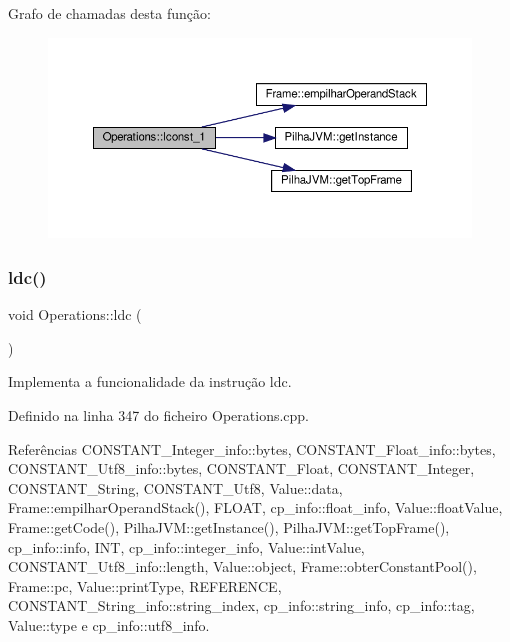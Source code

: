 Grafo de chamadas desta função\+:
\nopagebreak
\begin{figure}[H]
\begin{center}
\leavevmode
\includegraphics[width=350pt]{classOperations_ae6c6a8e3d75dec712e534434f85909ce_cgraph}
\end{center}
\end{figure}
\mbox{\label{classOperations_aa9a87c1ef4605d0b7b7a99c8d9bc693c}} 
\subsubsection{\texorpdfstring{ldc()}{ldc()}}
{\footnotesize\ttfamily void Operations\+::ldc (\begin{DoxyParamCaption}{ }\end{DoxyParamCaption})\hspace{0.3cm}{\ttfamily [private]}}



Implementa a funcionalidade da instrução ldc. 



Definido na linha 347 do ficheiro Operations.\+cpp.



Referências C\+O\+N\+S\+T\+A\+N\+T\+\_\+\+Integer\+\_\+info\+::bytes, C\+O\+N\+S\+T\+A\+N\+T\+\_\+\+Float\+\_\+info\+::bytes, C\+O\+N\+S\+T\+A\+N\+T\+\_\+\+Utf8\+\_\+info\+::bytes, C\+O\+N\+S\+T\+A\+N\+T\+\_\+\+Float, C\+O\+N\+S\+T\+A\+N\+T\+\_\+\+Integer, C\+O\+N\+S\+T\+A\+N\+T\+\_\+\+String, C\+O\+N\+S\+T\+A\+N\+T\+\_\+\+Utf8, Value\+::data, Frame\+::empilhar\+Operand\+Stack(), F\+L\+O\+AT, cp\+\_\+info\+::float\+\_\+info, Value\+::float\+Value, Frame\+::get\+Code(), Pilha\+J\+V\+M\+::get\+Instance(), Pilha\+J\+V\+M\+::get\+Top\+Frame(), cp\+\_\+info\+::info, I\+NT, cp\+\_\+info\+::integer\+\_\+info, Value\+::int\+Value, C\+O\+N\+S\+T\+A\+N\+T\+\_\+\+Utf8\+\_\+info\+::length, Value\+::object, Frame\+::obter\+Constant\+Pool(), Frame\+::pc, Value\+::print\+Type, R\+E\+F\+E\+R\+E\+N\+CE, C\+O\+N\+S\+T\+A\+N\+T\+\_\+\+String\+\_\+info\+::string\+\_\+index, cp\+\_\+info\+::string\+\_\+info, cp\+\_\+info\+::tag, Value\+::type e cp\+\_\+info\+::utf8\+\_\+info.



